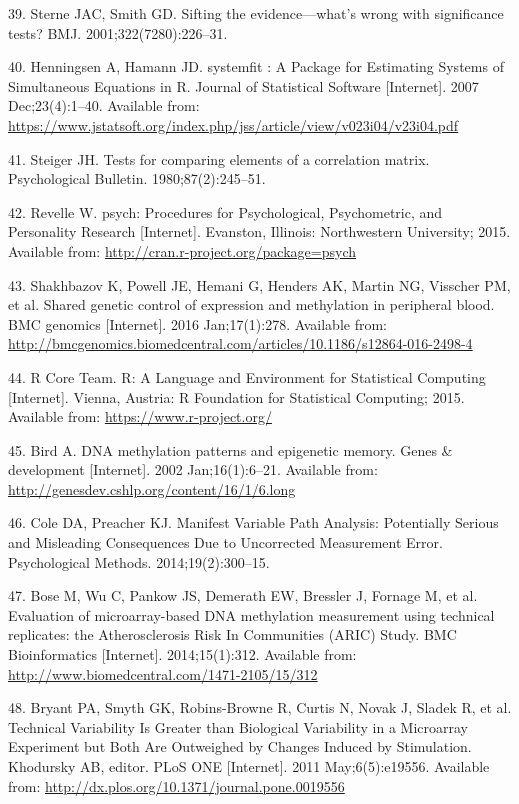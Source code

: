 \documentclass[]{article}
\begin{document}
\hypertarget{ref-Sterne2001}{}
39. Sterne JAC, Smith GD. Sifting the evidence---what's wrong with
significance tests? BMJ. 2001;322(7280):226--31.

\hypertarget{ref-Henningsen2007}{}
40. Henningsen A, Hamann JD. systemfit : A Package for Estimating
Systems of Simultaneous Equations in R. Journal of Statistical Software
{[}Internet{]}. 2007 Dec;23(4):1--40. Available from:
\url{https://www.jstatsoft.org/index.php/jss/article/view/v023i04/v23i04.pdf}

\hypertarget{ref-Steiger1980}{}
41. Steiger JH. Tests for comparing elements of a correlation matrix.
Psychological Bulletin. 1980;87(2):245--51.

\hypertarget{ref-Revelle2015}{}
42. Revelle W. psych: Procedures for Psychological, Psychometric, and
Personality Research {[}Internet{]}. Evanston, Illinois: Northwestern
University; 2015. Available from:
\url{http://cran.r-project.org/package=psych}

\hypertarget{ref-Shakhbazov2016}{}
43. Shakhbazov K, Powell JE, Hemani G, Henders AK, Martin NG, Visscher
PM, et al. Shared genetic control of expression and methylation in
peripheral blood. BMC genomics {[}Internet{]}. 2016 Jan;17(1):278.
Available from:
\url{http://bmcgenomics.biomedcentral.com/articles/10.1186/s12864-016-2498-4}

\hypertarget{ref-RCoreTeam2015}{}
44. R Core Team. R: A Language and Environment for Statistical Computing
{[}Internet{]}. Vienna, Austria: R Foundation for Statistical Computing;
2015. Available from: \url{https://www.r-project.org/}

\hypertarget{ref-Bird2002}{}
45. Bird A. DNA methylation patterns and epigenetic memory. Genes \&
development {[}Internet{]}. 2002 Jan;16(1):6--21. Available from:
\url{http://genesdev.cshlp.org/content/16/1/6.long}

\hypertarget{ref-Cole2014}{}
46. Cole DA, Preacher KJ. Manifest Variable Path Analysis: Potentially
Serious and Misleading Consequences Due to Uncorrected Measurement
Error. Psychological Methods. 2014;19(2):300--15.

\hypertarget{ref-Bose2014}{}
47. Bose M, Wu C, Pankow JS, Demerath EW, Bressler J, Fornage M, et al.
Evaluation of microarray-based DNA methylation measurement using
technical replicates: the Atherosclerosis Risk In Communities (ARIC)
Study. BMC Bioinformatics {[}Internet{]}. 2014;15(1):312. Available
from: \url{http://www.biomedcentral.com/1471-2105/15/312}

\hypertarget{ref-Bryant2011}{}
48. Bryant PA, Smyth GK, Robins-Browne R, Curtis N, Novak J, Sladek R,
et al. Technical Variability Is Greater than Biological Variability in a
Microarray Experiment but Both Are Outweighed by Changes Induced by
Stimulation. Khodursky AB, editor. PLoS ONE {[}Internet{]}. 2011
May;6(5):e19556. Available from:
\url{http://dx.plos.org/10.1371/journal.pone.0019556}
\end{document}
